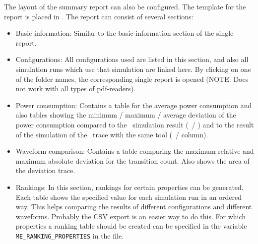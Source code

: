 The layout of the summary report can also be configured. The template
for the report is placed in . The report can consist of
several sections: 
\begin{itemize}
\item Basic information: Similar to the basic information
section of the single  report. 
\item Configurations: All configurations used are listed in this section, and 
also all simulation runs which use that simulation are linked here. By clicking 
on one of the folder names, the corresponding single report is opened (NOTE: 
Does not work with all types of pdf-readers). 
\item Power consumption: Contains a table for the
average power consumption and also tables showing the minimum / maximum
/ average deviation of the power consumption compared to the \spice\
simulation result (\spice\ / \spice) and to the result of the simulation of the
\spice\ trace with the same tool (\spice\ / column). 
\item Waveform comparison: Contains a table comparing the maximum relative and 
maximum absolute deviation for the transition count. Also shows the area of the 
deviation trace. 
\item Rankings: In this section, rankings for certain properties can
be generated. Each table shows the specified value for each simulation
run in an ordered way. This helps comparing the results of different
configurations and different waveforms. Probably the CSV export is an
easier way to do this. For which properties a ranking table should be
created can be specified in the variable \lstinline|ME_RANKING_PROPERTIES| in
the \file{multi\_exec.cfg} file.
\end{itemize}
